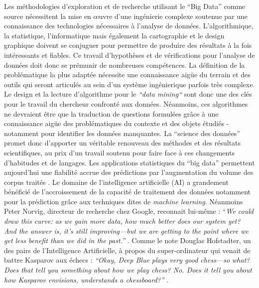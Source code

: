 Les méthodologies d{\textquoteright}exploration et de recherche utilisant le {\textquotedblleft}Big Data{\textquotedblright} comme source nécessitent la mise en {\oe}uvre d{\textquoteright}une ingénierie complexe soutenue par une connaissance des technologies nécessaires à l{\textquoteright}analyse de données. L{\textquoteright}algorithmique, la statistique, l{\textquoteright}informatique mais également la cartographie et le design graphique doivent se conjuguer pour permettre de produire des résultats à la fois intéressants et fiables. Ce travail d{\textquoteright}hypothèses et de vérifications pour l{\textquoteright}analyse de données doit donc se prémunir de nombreuses compétences. La définition de la problématique la plus adaptée nécessite une connaissance aig\"ue du terrain et des outils qui seront articulés au sein d{\textquoteright}un système ingénierique parfois très complexe. Le design et la lecture d{\textquoteright}algorithme pour le \textit{{\textquotedblleft}data mining{\textquotedblleft}} sont donc une des clés pour le travail du chercheur confronté aux données. Néanmoins, ces algorithmes ne devraient \^etre que la traduction de questions formulées gr\^ace à une connaissance aig\"ue des problématiques du contexte et des objets étudiés - notamment pour identifier les données manquantes. La {\textquotedblleft}science des données{\textquotedblright} promet donc d{\textquoteright}apporter un véritable renouveau des méthodes et des résultats scientifiques, au prix d{\textquoteright}un travail soutenu pour faire face à ces changements d{\textquoteright}habitudes et de langages. Les applications statistiques du {\textquotedblleft}big data{\textquotedblright} permettent aujourd{\textquoteright}hui une fiabilité accrue des prédictions par l{\textquoteright}augmentation du volume des corpus traités \citep{Breiman2001}. Le domaine de l{\textquoteright}intelligence artificielle (AI) a grandement bénéficié de l{\textquoteright}accroissement de la capacité de traitement des données notamment pour la prédiction gr\^ace aux techniques dites de \textit{machine learning}. Néanmoins Peter Norvig, directeur de recherche chez Google, reconnait lui-m\^eme : {\textquotedblleft}\textit{We could draw this curve: as we gain more data, how much better does our system get? And the answer is, it{\textquoteright}s still improving---but we are getting to the point where we get less benefit than we did in the past.{\textquotedblright} }\citep{Somers2013}. Comme le note Douglas Hofstadter, un des pairs de l{\textquoteright}Intelligence Artificielle, à propos du super-ordinateur qui venait de battre Kasparov aux échecs : \textit{{\textquotedblleft}Okay, Deep Blue plays very good chess---so what? Does that tell you something about how we play chess? No. Does it tell you about how Kasparov envisions, understands a chessboard?{\textquotedblright} }\citep{Somers2013}.  

